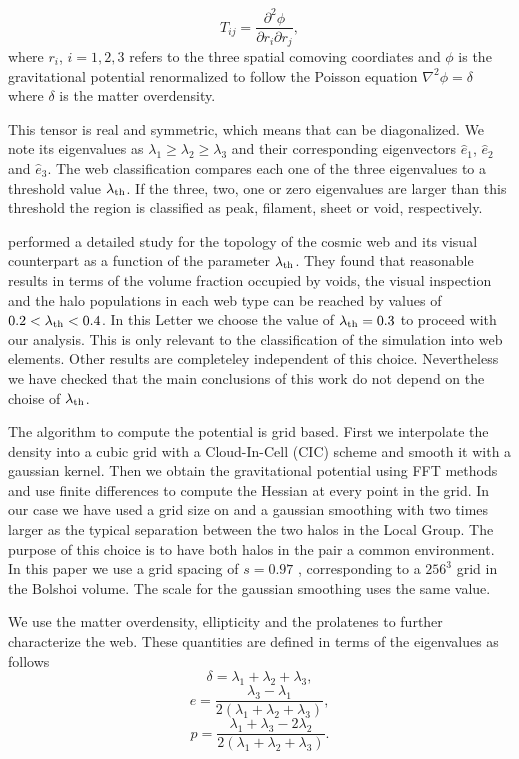 \documentclass{emulateapj}
\newcommand{\hMpc}{{\ifmmode{h^{-1}{\rm Mpc}}\else{$h^{-1}$Mpc }\fi}}
\begin{document}
\begin{equation}
T_{ij} = \frac{\partial^2 \phi}{\partial r_i \partial r_j}, 
\end{equation}
%
where $r_{i}$, $i=1,2,3$ refers to the three spatial comoving
coordiates and $\phi$ is the gravitational potential renormalized to
follow the Poisson equation $\nabla^2\phi=\delta$ where
$\delta$ is the matter overdensity.  

This tensor is real and symmetric, which means that can be
diagonalized. 
We note its eigenvalues as $\lambda_1\geq \lambda_2\geq
\lambda_3$ and their corresponding eigenvectors $\hat{e}_1$,
$\hat{e}_2$ and $\hat{e}_3$. 
The web classification compares each one
of the three eigenvalues to a threshold value $\lambda_{\rm th}$. 
If
the three, two, one or zero eigenvalues are larger than this threshold
the region is classified as peak, filament, sheet or void,
respectively.  

\cite{Tweb} performed a detailed study for the topology of the
cosmic web and its visual counterpart as a function of the parameter
$\lambda_{\rm th}$. 
They found that reasonable results in terms of the
volume fraction occupied by voids, the visual inspection and the halo
populations in each web type can be reached by values of $0.2<\lambda_{\rm
th}<0.4$. 
In this Letter we choose the value of $\lambda_{\rm
  th}=0.3$ to proceed with our analysis. 
This is only relevant to the classification of the simulation into web
elements. Other results are completeley independent of this
choice. Nevertheless we have checked that the main conclusions of this
work do not depend on the choise of $\lambda_{\rm th}$.


The algorithm to compute the potential is grid based. First we
interpolate the density into a cubic grid with a Cloud-In-Cell (CIC)
scheme and smooth it with a gaussian kernel. 
Then we obtain the
gravitational potential using FFT methods and use finite differences
to compute the Hessian at every point in the grid. 
In our case we have
used a grid size on and a gaussian smoothing with two times larger as
the typical separation between the two halos in the Local Group. 
The
purpose of this choice is to have both halos in the pair a common
environment. In this paper we use a grid spacing of $s=0.97$ \hMpc,
corresponding to a $256^3$ grid in the Bolshoi volume. 
The scale for
the gaussian smoothing uses the same value.

We use the matter overdensity, ellipticity and the prolatenes to
further characterize the web. 
These quantities are defined in terms of the
eigenvalues as follows 
%
\begin{equation}
\delta = \lambda_1 + \lambda_2 + \lambda_3,
\end{equation}
%
\begin{equation}
e= \frac{\lambda_3 - \lambda_1}{2(\lambda_1 + \lambda_2 + \lambda_3)}, 
\end{equation}
%
\begin{equation}
p= \frac{\lambda_1 + \lambda_3 - 2\lambda_2}{2(\lambda_1 + \lambda_2 +
  \lambda_3)}.
\end{equation}
\end{document}
